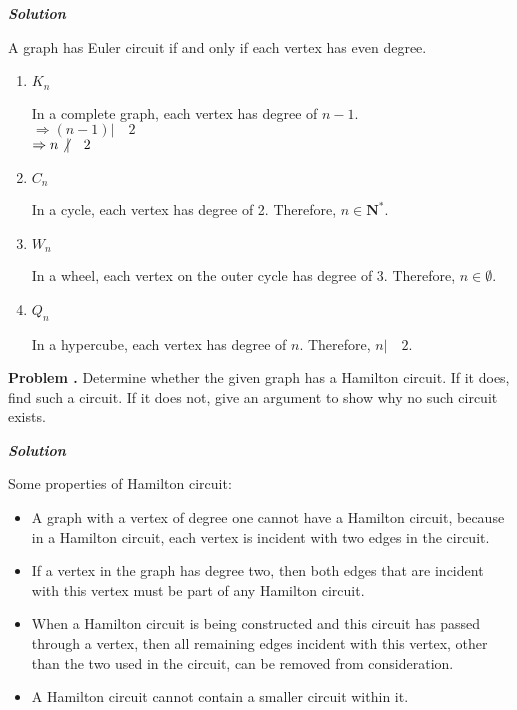 \documentclass[10pt]{article}
\newcounter{problem}
\newcommand{\problem}{\textbf{\refstepcounter{problem}Problem \theproblem.} }
\newcommand{\solution}{\vspace{0.5cm}\textbf{\textit{Solution}} \\}
\begin{document}
\solution
\par A graph has Euler circuit if and only if each vertex has even degree.
\begin{enumerate}[label=(\alph*)]
    \item $K_{n}$ \\
        \par In a complete graph, each vertex has degree of $n - 1$. \\
        $\Rightarrow (n - 1) \vert \quad 2$ \\
        $\Rightarrow n \not \vert \quad 2$
    \item $C_{n}$
        \par In a cycle, each vertex has degree of 2. Therefore, $n \in \mathbf{N}^{*}$. \\
    \item $W_{n}$
        \par In a wheel, each vertex on the outer cycle has degree of 3. Therefore, $n \in \emptyset$.
    \item $Q_{n}$
        \par In a hypercube, each vertex has degree of $n$. Therefore, $n \vert \quad 2$.
\end{enumerate}

\problem Determine whether the given graph has a Hamilton circuit. If it does, find such a circuit.
If it does not, give an argument to show why no such circuit exists.

\solution
\par Some properties of Hamilton circuit:
    \begin{itemize}    
        \item A graph with a vertex of degree one cannot have a Hamilton circuit, because in a
            Hamilton circuit, each vertex is incident with two edges in the circuit.
        \item If a vertex in the graph has degree two, then both edges that are incident with this
            vertex must be part of any Hamilton circuit.
        \item When a Hamilton circuit is being constructed and this circuit has passed through a
            vertex, then all remaining edges incident with this vertex, other than the two used in
            the circuit, can be removed from consideration.
        \item A Hamilton circuit cannot contain a smaller circuit within it.
    \end{itemize}    
\end{document}
